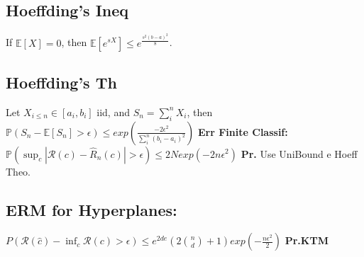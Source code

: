 \subsection*{Hoeffding's Ineq}
If $\mathbb{E}[X]=0$, then $\mathbb{E}[e^{sX}]\le e^{\frac{s^2(b-a)^2}{8}}$.
\subsection*{Hoeffding's Th}
Let $X_{i\le n}\in[a_i,b_i]$ iid, and $S_n=\sum_i^nX_i$, then $\mathbb{P}(S_n-\mathbb{E}[S_n]>\epsilon)\le exp(\frac{-2\epsilon^2}{\sum_i^n(b_i-a_i)^2})$
\textbf{Err Finite Classif:} $\mathbb{P}(\sup_c|\mathcal R(c)-\hat R_n(c)|>\epsilon)\le 2Nexp(-2n\epsilon^2)$ \textbf{Pr.} Use UniBound e Hoeff Theo.
\subsection*{ERM for Hyperplanes:}$P(\mathcal R(\hat c)-\inf_c\mathcal R(c)>\epsilon)\le e^{2de}(2\binom nd+1)exp(-\frac{n\epsilon^2}{2})$ \textbf{Pr.KTM}
